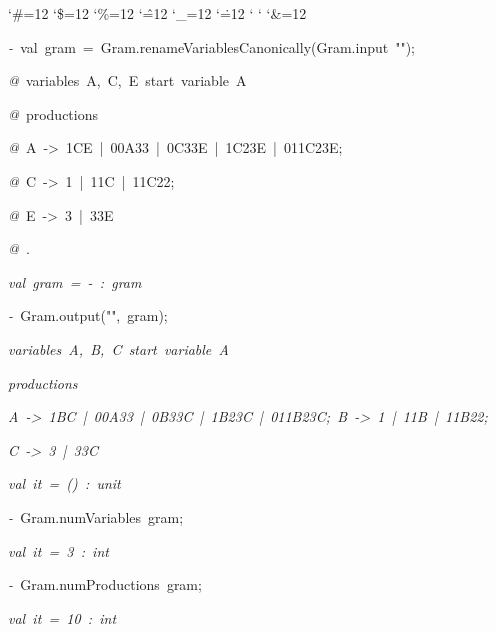 \begin{list}{}
{\setlength{\leftmargin}{\leftmargini}
\setlength{\rightmargin}{0cm}
\setlength{\itemindent}{0cm}
\setlength{\listparindent}{0cm}
\setlength{\itemsep}{0cm}
\setlength{\parsep}{0cm}
\setlength{\labelsep}{0cm}
\setlength{\labelwidth}{0cm}
\catcode`\#=12
\catcode`\$=12
\catcode`\%=12
\catcode`\^=12
\catcode`\_=12
\catcode`\.=12
\catcode`
\catcode`
\catcode`\&=12
\ttfamily}
\small
\item[]\textsl{-\ }val\ gram\ =\ Gram.renameVariablesCanonically(Gram.input\ "");
\item[]\textsl{@\ }variables\ A,\ C,\ E\ start\ variable\ A
\item[]\textsl{@\ }productions
\item[]\textsl{@\ }A\ ->\ 1CE\ |\ 00A33\ |\ 0C33E\ |\ 1C23E\ |\ 011C23E;
\item[]\textsl{@\ }C\ ->\ 1\ |\ 11C\ |\ 11C22;
\item[]\textsl{@\ }E\ ->\ 3\ |\ 33E
\item[]\textsl{@\ }.
\item[]\textsl{val\ gram\ =\ -\ :\ gram}
\item[]\textsl{-\ }Gram.output("",\ gram);
\item[]\textsl{variables\ A,\ B,\ C\ start\ variable\ A}
\item[]\textsl{productions}
\item[]\textsl{A\ ->\ 1BC\ |\ 00A33\ |\ 0B33C\ |\ 1B23C\ |\ 011B23C;\ B\ ->\ 1\ |\ 11B\ |\ 11B22;}
\item[]\textsl{C\ ->\ 3\ |\ 33C}
\item[]\textsl{val\ it\ =\ ()\ :\ unit}
\item[]\textsl{-\ }Gram.numVariables\ gram;
\item[]\textsl{val\ it\ =\ 3\ :\ int}
\item[]\textsl{-\ }Gram.numProductions\ gram;
\item[]\textsl{val\ it\ =\ 10\ :\ int}
\end{list}
